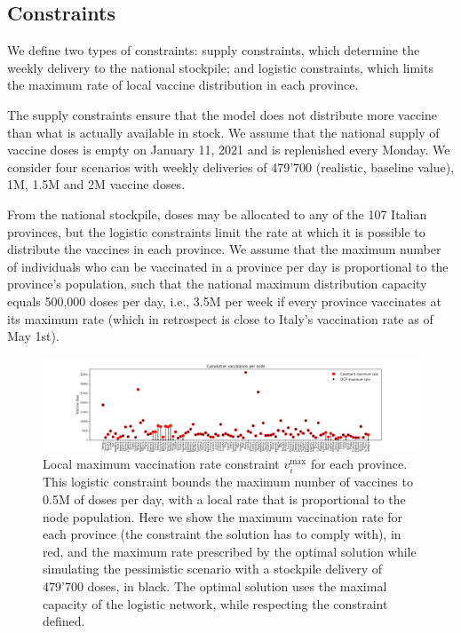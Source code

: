 \subsection{Constraints} We define two types of constraints: supply constraints, which determine the weekly delivery to the national stockpile; and logistic constraints, which limits the maximum rate of local vaccine distribution in each province.

The supply constraints ensure that the model does not distribute more vaccine than what is actually available in stock. We assume that the national supply of vaccine doses is empty on January 11, 2021 and is replenished every Monday. We consider four scenarios with weekly deliveries of 479'700 (realistic, baseline value), 1M, 1.5M and 2M vaccine doses.

From the national stockpile, doses may be allocated to any of the 107 Italian provinces, but the logistic constraints limit the rate at which it is possible to distribute the vaccines in each province. We assume that the maximum number of individuals who can be vaccinated in a province per day is proportional to the province's population, such that the national maximum distribution capacity equals 500,000 doses per day, i.e., 3.5M per week if every province vaccinates at its maximum rate (which in retrospect is close to Italy's vaccination rate as of May 1st). 

\begin{figure}[!ht]
    \centering
    \includegraphics{fig_italy-ocp/figuresSI/SI_constraint_dist.pdf}
    \caption[Vizualisation of the local maximum vaccination rate constraint]{Local maximum vaccination rate constraint $v_i^\mathrm{max}$ for each province. This logistic constraint bounds the maximum number of vaccines to 0.5M of doses per day, with a local rate that is proportional to the node population. Here we show the maximum vaccination rate for each province (the constraint the solution has to comply with), in red, and the maximum rate prescribed by the optimal solution while simulating the pessimistic scenario with a stockpile delivery of 479'700 doses, in black. The optimal solution uses the maximal capacity of the logistic network, while respecting the constraint defined.}
    \label{fig:OC_logistic_constraints}
\end{figure}


